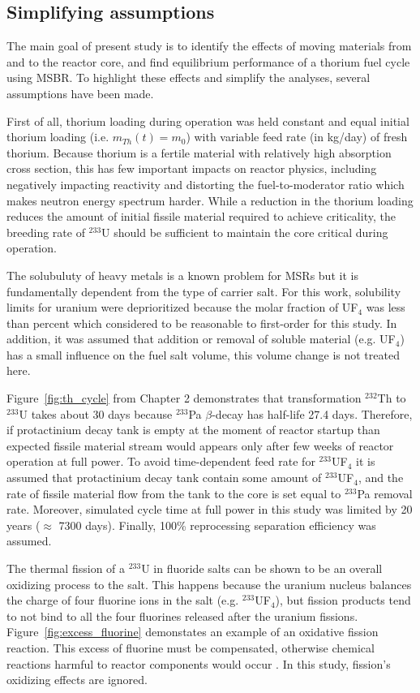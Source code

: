 \subsection{Simplifying assumptions}
The main goal of present study is to identify the effects of moving materials from and to the reactor core, and find equilibrium performance of a thorium fuel cycle using \gls{MSBR}. To highlight these effects and simplify the analyses, several assumptions have been made.

First of all, thorium loading during operation was held constant and equal initial thorium loading (i.e. $m_{Th}(t)=m_0$) with variable feed rate (in kg/day) of fresh thorium. Because thorium is a fertile material with relatively high absorption cross section, this has few important impacts on reactor physics, including negatively impacting reactivity and distorting the fuel-to-moderator ratio which makes neutron energy spectrum harder. While a reduction in the thorium loading reduces the amount of initial fissile material required to achieve criticality, the breeding rate of $^{233}$U should be sufficient to maintain the core critical during operation.

The solubuluty of heavy metals is a known problem for \glspl{MSR} but it is fundamentally dependent from the type of carrier salt. For this work, solubility limits for uranium were deprioritized because the molar fraction of UF$_4$ was less than percent which considered to be reasonable to first-order for this study. In addition, it was assumed that addition or removal of soluble material (e.g. UF$_4$) has a small influence on the fuel salt volume, this volume change is not treated here.

Figure~\ref{fig:th_cycle} from Chapter 2 demonstrates that transformation $^{232}$Th to $^{233}$U takes about 30 days because $^{233}$Pa $\beta$-decay has half-life 27.4 days. Therefore, if protactinium decay tank is empty at the moment of reactor startup than expected fissile material stream would appears only after few weeks of reactor operation at full power. To avoid time-dependent feed rate for $^{233}$UF$_4$ it is assumed that protactinium decay tank contain some amount of $^{233}$UF$_4$, and the rate of fissile material flow from the tank to the core is set equal to $^{233}$Pa removal rate. Moreover, simulated cycle time at full power in this study was limited by 20 years ($\approx$ 7300 days). Finally, 100\% reprocessing separation efficiency was assumed.

The thermal fission of a $^{233}$U in fluoride salts can be shown to be an overall oxidizing process to the salt. This happens because the uranium nucleus balances the charge of four fluorine ions in the salt (e.g. $^{233}$UF$_4$), but fission products tend to not bind to all the four fluorines released after the uranium fissions. Figure~\ref{fig:excess_fluorine} demonstates an example of an oxidative fission reaction. This excess of fluorine must be compensated, otherwise chemical reactions harmful to reactor components would occur \cite{ridley_method_2017}. In this study, fission’s oxidizing effects are ignored.

